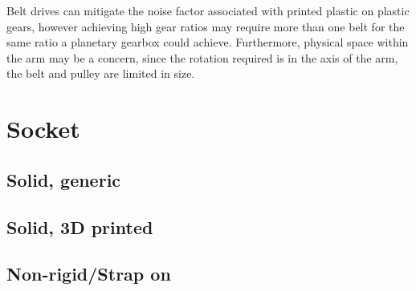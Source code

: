 \documentclass[12pt,3p]{report}
\begin{document}
\begin{multicols}{2}
\begin{enumerate}
{Belt drives can mitigate the noise factor associated with printed plastic on plastic gears, however achieving high gear ratios may require more than one belt for the same ratio a planetary gearbox could achieve. Furthermore, physical space within the arm may be a concern, since the rotation required is in the axis of the arm, the belt and pulley are limited in size.
			}	
			\end{enumerate}


	
	
	\section{Socket}
		
		\subsection{Solid, generic}
		

		
		\subsection{Solid, 3D printed}
		
		
		
		\subsection{Non-rigid/Strap on}
		
				\pagebreak
			\end{multicols}	
\end{document}

